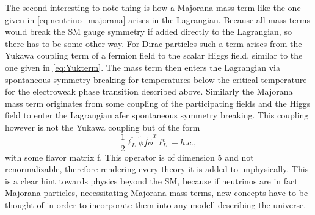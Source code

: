 The second interesting to note thing is how a Majorana mass term like the one given in \eqref{eq:neutrino_majorana} arises in the Lagrangian. Because all mass terms would break the SM gauge symmetry if added directly to the Lagrangian, so there has to be some other way. For Dirac particles such a term arises from the Yukawa coupling term of a fermion field to the scalar Higgs field, similar to the one given in \eqref{eq:Yukterm}. The mass term then enters the Lagrangian via spontaneous symmetry breaking for temperatures below the critical temperature for the electroweak phase transition described above. Similarly the Majorana mass term originates from some coupling of the participating fields and the Higgs field to enter the Lagrangian afer spontaneous symmetry breaking. This coupling however is not the Yukawa coupling but of the form \cite[Eq. (5)]{Drewes:2013gca}
\begin{equation}
	\frac{1}{2}\overline{\ell_L}\tilde{\phi}f\tilde{\phi}^T\ell^c_L+h.c.,
\end{equation}
with some flavor matrix f. This operator is of dimension 5 and not renormalizable, therefore rendering every theory it is added to unphysically. This is a clear hint towards physics beyond the SM, because if neutrinos are in fact Majorana particles, necessitating Majorana mass terms, new concepts have to be thought of in order to incorporate them into any modell describing the universe. 
